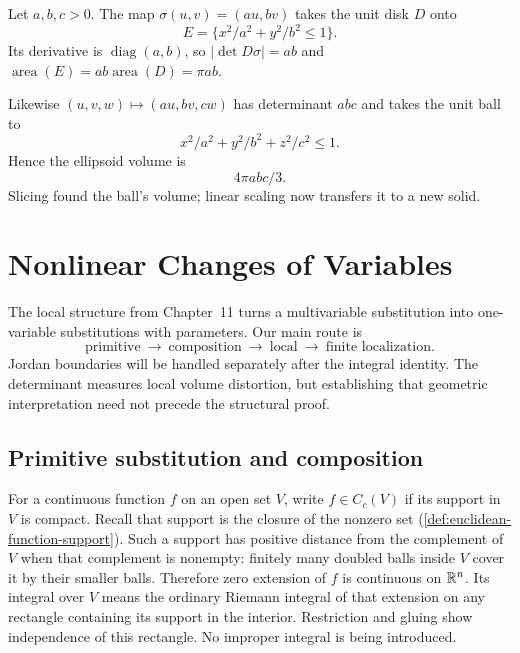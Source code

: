 \begin{example}\label{ex:ellipse-scaling}
Let $a,b,c>0$. The map $\sigma(u,v)=(au,bv)$ takes the unit disk $D$
onto
\[
E=\{x^2/a^2+y^2/b^2\leq1\}.
\]
 Its derivative is
$\operatorname{diag}(a,b)$, so $|\det D\sigma|=ab$ and
$\operatorname{area}(E)=ab\operatorname{area}(D)=\pi ab$.
\begin{center}
\end{center}
Likewise $(u,v,w)\mapsto(au,bv,cw)$ has determinant $abc$ and takes
the unit ball to
\[
x^2/a^2+y^2/b^2+z^2/c^2\leq1.
\]
 Hence the ellipsoid
volume is
\[
4\pi abc/3.
\]
 Slicing found the ball's volume; linear scaling
now transfers it to a new solid.
\end{example}

\section{Nonlinear Changes of Variables}
\label{sec:nonlinear-change}
The local structure from Chapter~11 turns a multivariable substitution
into one-variable substitutions with parameters. Our main route is
\[
\boxed{\text{primitive}\ \longrightarrow\ \text{composition}\
\longrightarrow\ \text{local}\ \longrightarrow\ \text{finite localization}.}
\]
Jordan boundaries will be handled separately after the integral identity.
The determinant measures local volume distortion, but establishing that
geometric interpretation need not precede the structural proof.

\subsection{Primitive substitution and composition}
For a continuous function $f$ on an open set $V$, write $f\in C_c(V)$
if its support in $V$ is compact. Recall that support is the closure of
the nonzero set (\cref{def:euclidean-function-support}). Such a support has positive distance
from the complement of $V$ when that complement is nonempty: finitely
many doubled balls inside $V$ cover it by their smaller balls. Therefore
zero extension of $f$ is continuous on $\mathbb{R}^n$. Its integral over $V$
means the ordinary Riemann integral of that extension on any rectangle
containing its support in the interior. Restriction and gluing show
independence of this rectangle. No improper integral is being introduced.

